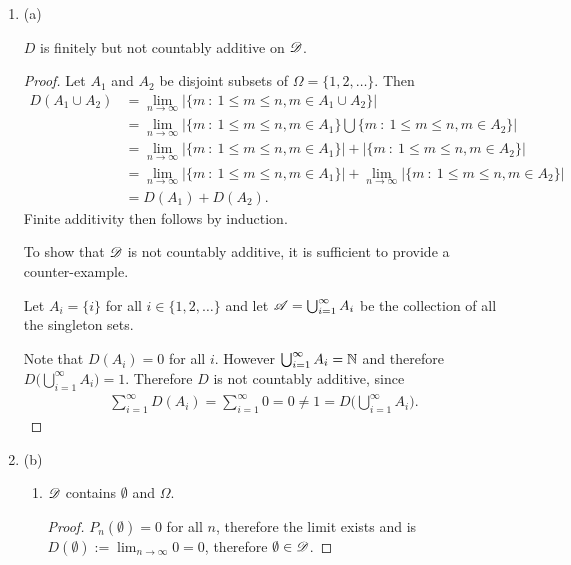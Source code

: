 \begin{enumerate}
\begin{enumerate}[label=(\alph*)]
  \item (a)
    \begin{claim*}
      $D$ is finitely but not countably additive on $\mathscr D$.
    \end{claim*}
    \begin{proof}
      Let $A_1$ and $A_2$ be disjoint subsets of $\Omega = \{1, 2, \ldots\}$. Then
      \begin{align*}
        D(A_1 \cup A_2)
        &= \lim_{n\to\infty} \big|\big\{m ~:~ 1 \leq m \leq n, m \in A_1 \cup A_2 \big\}\big| \\
        &= \lim_{n\to\infty} \big|\big\{m ~:~ 1 \leq m \leq n, m \in A_1 \big\} \bigcup \big\{m ~:~ 1 \leq m \leq n, m \in A_2 \big\}\big|\\
        &= \lim_{n\to\infty} \big|\big\{m ~:~ 1 \leq m \leq n, m \in A_1 \big\}\big| + \big|\big\{m ~:~ 1 \leq m \leq n, m \in A_2 \big\}\big| \\
        &= \lim_{n\to\infty} \big|\big\{m ~:~ 1 \leq m \leq n, m \in A_1 \big\}\big| + \lim_{n\to\infty} \big|\big\{m ~:~ 1 \leq m \leq n, m \in A_2 \big\}\big| \\
        &= D(A_1) + D(A_2).
      \end{align*}
      Finite additivity then follows by induction. 

      To show that $\mathscr D$ is not countably additive, it is sufficient to provide a counter-example.

      Let $A_i = \{i\}$ for all $i \in \{1, 2, \ldots\}$ and let $\mathscr A = \bigcup_{i=1}^\infty A_i$ be the collection of all the singleton sets.

      Note that $D(A_i) = 0$ for all $i$. However $\bigcup_{i=1}^\infty A_i = \mathbb{N}$ and
      therefore $D\big(\bigcup_{i=1}^\infty A_i\big) = 1$. Therefore $D$ is not countably additive, since
      \begin{align*}
        \sum_{i=1}^\infty D(A_i) = \sum_{i=1}^\infty 0 = 0 \neq 1 = D\big(\bigcup_{i=1}^\infty A_i\big).
      \end{align*}
    \end{proof}

  \item (b)
    \begin{enumerate}
    \item
      \begin{claim*}
        $\mathscr D$ contains $\emptyset$ and $\Omega$.
      \end{claim*}
      \begin{proof}
        $P_n(\emptyset) = 0$ for all $n$, therefore the limit exists and
        is $D(\emptyset) := \lim_{n\to\infty} 0 = 0$, therefore $\emptyset \in \mathscr D$.


\end{proof}
\end{enumerate}
\end{enumerate}
\end{enumerate}
